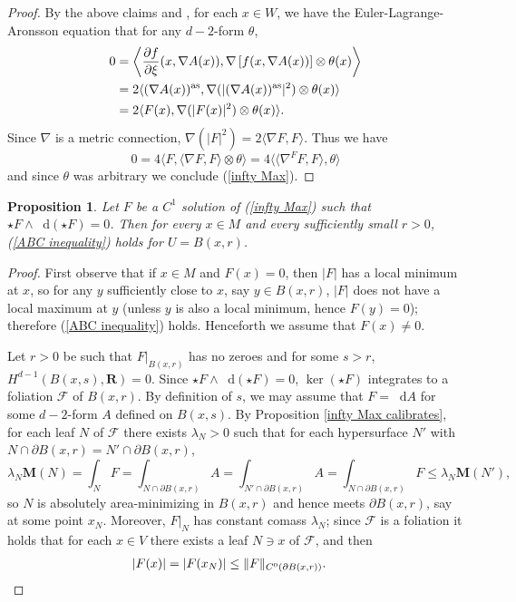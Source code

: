 \documentclass[reqno,11pt]{amsart}
\newcommand{\RR}{\mathbf{R}}
\newcommand*\dif{\mathop{}\!\mathrm{d}}
\newcommand{\Mass}{\mathbf M}
\newtheorem{proposition}[theorem]{Proposition}
\theoremstyle{definition}
\numberwithin{equation}{section}
\begin{document}
\begin{proof}
By the above claims and \cite[Theorem 5.2]{Barron2001}, for each $x \in W$, we have the Euler-Lagrange-Aronsson equation that for any $d - 2$-form $\theta$,
\begin{align*}
0 
&= \left\langle \frac{\partial f}{\partial \xi}(x, \nabla A(x)), \nabla \left[f(x, \nabla A(x))\right] \otimes \theta(x)\right\rangle \\
&= 2\langle (\nabla A(x))^{\rm as}, \nabla(|(\nabla A(x))^{\rm as}|^2) \otimes \theta(x)\rangle \\
&= 2\langle F(x), \nabla(|F(x)|^2) \otimes \theta(x)\rangle.
\end{align*}
Since $\nabla$ is a metric connection, $\nabla(|F|^2) = 2\langle \nabla F, F\rangle$.
Thus we have 
$$0 = 4\langle F, \langle \nabla F, F\rangle \otimes \theta\rangle = 4\langle \langle \nabla^F F, F\rangle, \theta\rangle$$
and since $\theta$ was arbitrary we conclude (\ref{infty Max}).
\end{proof}

\begin{proposition}
Let $F$ be a $C^1$ solution of (\ref{infty Max}) such that $\star F \wedge \dif(\star F) = 0$.
Then for every $x \in M$ and every sufficiently small $r > 0$, (\ref{ABC inequality}) holds for $U = B(x, r)$.
\end{proposition}
\begin{proof}
First observe that if $x \in M$ and $F(x) = 0$, then $|F|$ has a local minimum at $x$, so for any $y$ sufficiently close to $x$, say $y \in B(x, r)$, $|F|$ does not have a local maximum at $y$ (unless $y$ is also a local minimum, hence $F(y) = 0$); therefore (\ref{ABC inequality}) holds.
Henceforth we assume that $F(x) \neq 0$.

Let $r > 0$ be such that $F|_{B(x, r)}$ has no zeroes and for some $s > r$, $H^{d - 1}(B(x, s), \RR) = 0$.
Since $\star F \wedge \dif(\star F) = 0$, $\ker(\star F)$ integrates to a foliation $\mathscr F$ of $B(x, r)$.
By definition of $s$, we may assume that $F = \dif A$ for some $d - 2$-form $A$ defined on $B(x, s)$.
By Proposition \ref{infty Max calibrates}, for each leaf $N$ of $\mathscr F$ there exists $\lambda_N > 0$ such that for each hypersurface $N'$ with $N \cap \partial B(x, r) = N' \cap \partial B(x, r)$,
$$\lambda_N \Mass(N) = \int_N F = \int_{N \cap \partial B(x, r)} A = \int_{N' \cap \partial B(x, r)} A = \int_{N \cap \partial B(x, r)} F \leq \lambda_N \Mass(N'),$$
so $N$ is absolutely area-minimizing in $B(x, r)$ and hence meets $\partial B(x, r)$, say at some point $x_N$.
Moreover, $F|_N$ has constant comass $\lambda_N$; since $\mathscr F$ is a foliation it holds that for each $x \in V$ there exists a leaf $N \ni x$ of $\mathscr F$, and then 
\begin{align*}
|F(x)| &= |F(x_N)| \leq \|F\|_{C^0(\partial B(x, r))}. \qedhere
\end{align*}
\end{proof}
\end{document}
